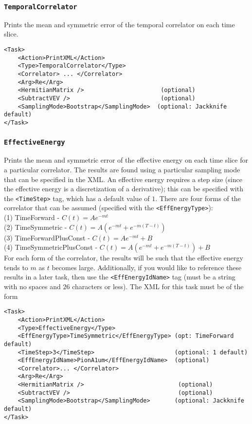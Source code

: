 \documentclass[12pt]{article}
\newcommand{\vb}{\texttt}
\begin{document}
\subsubsection{\vb{TemporalCorrelator}}
Prints the mean and symmetric error of the temporal correlator on each time slice.
\begin{verbatim}
<Task>
    <Action>PrintXML</Action>
    <Type>TemporalCorrelator</Type>
    <Correlator> ... </Correlator>
    <Arg>Re</Arg>
    <HermitianMatrix />                      (optional)
    <SubtractVEV />                          (optional)
    <SamplingMode>Bootstrap</SamplingMode>  (optional: Jackknife default)
</Task>
\end{verbatim}

\subsubsection{\vb{EffectiveEnergy}}
Prints the mean and symmetric error of
the effective energy on each time slice for a
particular correlator. The results are found using a particular sampling mode
that can be specified in the XML.
An effective energy requires a step size (since the effective energy
is a discretization of a derivative); this can be specified with
the \vb{<TimeStep>} tag, which has a default value of $1$.
There are four forms of the correlator that
can be assumed (specified with the \vb{<EffEnergyType>}): \\
\hspace*{15pt} (1) TimeForward - $C(t) = A e^{-m t}$ \\
\hspace*{15pt} (2) TimeSymmetric - $C(t) = A ( e^{-m t} + e^{-m (T-t)})$ \\
\hspace*{15pt} (3) TimeForwardPlusConst - $C(t) = A e^{-m t} + B$ \\
\hspace*{15pt} (4) TimeSymmetricPlusConst - $C(t) = A ( e^{-m t} + e^{-m (T-t)}) + B$ \\
For each form of the correlator, the results will be such that
the effective energy tends to $m$ as $t$ becomes large.
Additionally, if you would like to reference these results in a later task, then
use the \vb{<EffEnergyIdName>} tag (must be a string with no spaces and $26$ characters
or less). The XML for this task must be of the form
\begin{verbatim}
<Task>
    <Action>PrintXML</Action>
    <Type>EffectiveEnergy</Type>
    <EffEnergyType>TimeSymmetric</EffEnergyType> (opt: TimeForward default)
    <TimeStep>3</TimeStep>                       (optional: 1 default)
    <EffEnergyIdName>PionA1um</EffEnergyIdName>  (optional)
    <Correlator>... </Correlator>
    <Arg>Re</Arg>
    <HermitianMatrix />                           (optional)
    <SubtractVEV />                               (optional)
    <SamplingMode>Bootstrap</SamplingMode>       (optional: Jackknife default)
</Task>
\end{verbatim}
\end{document}
